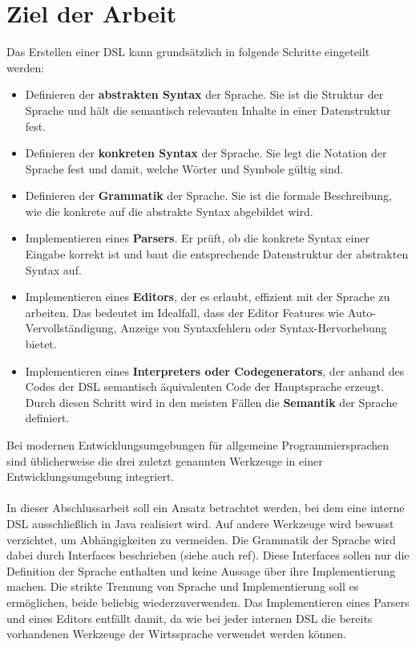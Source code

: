 \section{Ziel der Arbeit}\label{sct:ziel}
Das Erstellen einer DSL kann grundsätzlich in folgende Schritte eingeteilt werden:
\begin{itemize}
	\item Definieren der \textbf{abstrakten Syntax} der Sprache. Sie ist die Struktur der Sprache und hält die semantisch relevanten Inhalte in einer Datenstruktur fest\cite{www:heise}.
	\item Definieren der \textbf{konkreten Syntax} der Sprache. Sie legt die Notation der Sprache fest und damit, welche Wörter und Symbole gültig sind.
	\item Definieren der \textbf{Grammatik} der Sprache. Sie ist die formale Beschreibung, wie die konkrete auf die abstrakte Syntax abgebildet wird\cite{www:heise}.
	\item Implementieren eines \textbf{Parsers}. Er prüft, ob die konkrete Syntax einer Eingabe korrekt ist und baut die entsprechende Datenstruktur der abstrakten Syntax auf. 
	\item Implementieren eines \textbf{Editors}, der es erlaubt, effizient mit der Sprache zu arbeiten. Das bedeutet im Idealfall, dass der Editor Features wie Auto-Vervollständigung, Anzeige von Syntaxfehlern oder Syntax-Hervorhebung bietet.
	\item Implementieren eines \textbf{Interpreters oder Codegenerators}, der anhand des Codes der DSL semantisch äquivalenten Code der Hauptsprache erzeugt. Durch diesen Schritt wird in den meisten Fällen die \textbf{Semantik} der Sprache definiert.
\end{itemize}
Bei modernen Entwicklungsumgebungen für allgemeine Programmiersprachen sind üblicherweise die drei zuletzt genannten Werkzeuge in einer Entwicklungsumgebung integriert.
\\ \\ %
In dieser Abschlussarbeit soll ein Ansatz betrachtet werden, bei dem eine interne DSL ausschließlich in Java realisiert wird. Auf andere Werkzeuge wird bewusst verzichtet, um Abhängigkeiten zu vermeiden. Die Grammatik der Sprache wird dabei durch Interfaces beschrieben (siehe auch ref). Diese Interfaces sollen nur die Definition der Sprache enthalten und keine Aussage über ihre Implementierung machen. Die strikte Trennung von Sprache und Implementierung soll es ermöglichen, beide beliebig wiederzuverwenden.
Das Implementieren eines Parsers und eines Editors entfällt damit, da wie bei jeder internen DSL die bereits vorhandenen Werkzeuge der Wirtssprache verwendet werden können.

